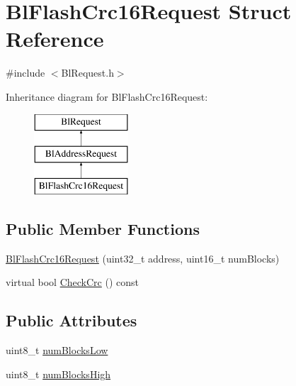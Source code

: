 \hypertarget{struct_bl_flash_crc16_request}{\section{Bl\-Flash\-Crc16\-Request Struct Reference}
\label{struct_bl_flash_crc16_request}
}


{\ttfamily \#include $<$Bl\-Request.\-h$>$}

Inheritance diagram for Bl\-Flash\-Crc16\-Request\-:\begin{figure}[H]
\begin{center}
\leavevmode
\includegraphics[height=3.000000cm]{struct_bl_flash_crc16_request}
\end{center}
\end{figure}
\subsection*{Public Member Functions}
\begin{DoxyCompactItemize}
\item 
\hyperlink{struct_bl_flash_crc16_request_a19119cb8b72cd5892ee4c75d8187ce36}{Bl\-Flash\-Crc16\-Request} (uint32\-\_\-t address, uint16\-\_\-t num\-Blocks)
\item 
virtual bool \hyperlink{struct_bl_flash_crc16_request_a8758fc8e47673ffc02fd7b79596b21d9}{Check\-Crc} () const 
\end{DoxyCompactItemize}
\subsection*{Public Attributes}
\begin{DoxyCompactItemize}
\item 
uint8\-\_\-t \hyperlink{struct_bl_flash_crc16_request_a9bf380a0e7aae6cb05f382c7dbf0f659}{num\-Blocks\-Low}
\item 
uint8\-\_\-t \hyperlink{struct_bl_flash_crc16_request_a99771cedf57ffdd7a1933caad05c56b8}{num\-Blocks\-High}
\end{DoxyCompactItemize}


